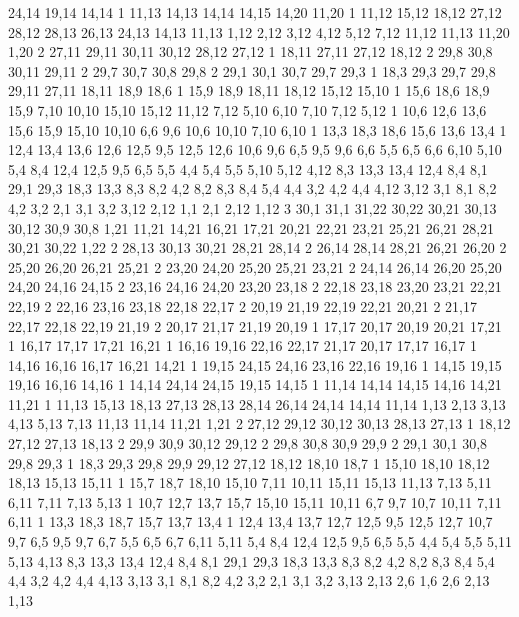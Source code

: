 24,14
19,14
14,14
1%
11,13
14,13
14,14
14,15
14,20
11,20
1%
11,12
15,12
18,12
27,12
28,12
28,13
26,13
24,13
14,13
11,13
%
1,12
2,12
3,12
4,12
5,12
7,12
11,12
11,13
11,20
1,20
2%
27,11
29,11
30,11
30,12
28,12
27,12
1%
18,11
27,11
27,12
18,12
2%
29,8
30,8
30,11
29,11
2%
29,7
30,7
30,8
29,8
2%
29,1
30,1
30,7
29,7
29,3
1%
18,3
29,3
29,7
29,8
29,11
27,11
18,11
18,9
18,6
1%
15,9
18,9
18,11
18,12
15,12
15,10
1%
15,6
18,6
18,9
15,9
%
7,10
10,10
15,10
15,12
11,12
7,12
%
5,10
6,10
7,10
7,12
5,12
1%
10,6
12,6
13,6
15,6
15,9
15,10
10,10
%
6,6
9,6
10,6
10,10
7,10
6,10
1%
13,3
18,3
18,6
15,6
13,6
13,4
1%
12,4
13,4
13,6
12,6
12,5
%
9,5
12,5
12,6
10,6
9,6
%
6,5
9,5
9,6
6,6
%
5,5
6,5
6,6
6,10
5,10
%
5,4
8,4
12,4
12,5
9,5
6,5
5,5
%
4,4
5,4
5,5
5,10
5,12
4,12
%
8,3
13,3
13,4
12,4
8,4
%
8,1
29,1
29,3
18,3
13,3
8,3
8,2
%
4,2
8,2
8,3
8,4
5,4
4,4
%
3,2
4,2
4,4
4,12
3,12
%
3,1
8,1
8,2
4,2
3,2
%
2,1
3,1
3,2
3,12
2,12
%
1,1
2,1
2,12
1,12
3%
30,1
31,1
31,22
30,22
30,21
30,13
30,12
30,9
30,8
%
1,21
11,21
14,21
16,21
17,21
20,21
22,21
23,21
25,21
26,21
28,21
30,21
30,22
1,22
2%
28,13
30,13
30,21
28,21
28,14
2%
26,14
28,14
28,21
26,21
26,20
2%
25,20
26,20
26,21
25,21
2%
23,20
24,20
25,20
25,21
23,21
2%
24,14
26,14
26,20
25,20
24,20
24,16
24,15
2%
23,16
24,16
24,20
23,20
23,18
2%
22,18
23,18
23,20
23,21
22,21
22,19
2%
22,16
23,16
23,18
22,18
22,17
2%
20,19
21,19
22,19
22,21
20,21
2%
21,17
22,17
22,18
22,19
21,19
2%
20,17
21,17
21,19
20,19
1%
17,17
20,17
20,19
20,21
17,21
1%
16,17
17,17
17,21
16,21
1%
16,16
19,16
22,16
22,17
21,17
20,17
17,17
16,17
1%
14,16
16,16
16,17
16,21
14,21
1%
19,15
24,15
24,16
23,16
22,16
19,16
1%
14,15
19,15
19,16
16,16
14,16
1%
14,14
24,14
24,15
19,15
14,15
1%
11,14
14,14
14,15
14,16
14,21
11,21
1%
11,13
15,13
18,13
27,13
28,13
28,14
26,14
24,14
14,14
11,14
%
1,13
2,13
3,13
4,13
5,13
7,13
11,13
11,14
11,21
1,21
2%
27,12
29,12
30,12
30,13
28,13
27,13
1%
18,12
27,12
27,13
18,13
2%
29,9
30,9
30,12
29,12
2%
29,8
30,8
30,9
29,9
2%
29,1
30,1
30,8
29,8
29,3
1%
18,3
29,3
29,8
29,9
29,12
27,12
18,12
18,10
18,7
1%
15,10
18,10
18,12
18,13
15,13
15,11
1%
15,7
18,7
18,10
15,10
%
7,11
10,11
15,11
15,13
11,13
7,13
%
5,11
6,11
7,11
7,13
5,13
1%
10,7
12,7
13,7
15,7
15,10
15,11
10,11
%
6,7
9,7
10,7
10,11
7,11
6,11
1%
13,3
18,3
18,7
15,7
13,7
13,4
1%
12,4
13,4
13,7
12,7
12,5
%
9,5
12,5
12,7
10,7
9,7
%
6,5
9,5
9,7
6,7
%
5,5
6,5
6,7
6,11
5,11
%
5,4
8,4
12,4
12,5
9,5
6,5
5,5
%
4,4
5,4
5,5
5,11
5,13
4,13
%
8,3
13,3
13,4
12,4
8,4
%
8,1
29,1
29,3
18,3
13,3
8,3
8,2
%
4,2
8,2
8,3
8,4
5,4
4,4
%
3,2
4,2
4,4
4,13
3,13
%
3,1
8,1
8,2
4,2
3,2
%
2,1
3,1
3,2
3,13
2,13
2,6
%
1,6
2,6
2,13
1,13
